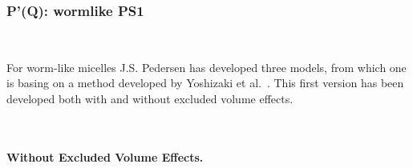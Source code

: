 \clearpage
\subsubsection{P'(Q): wormlike PS1} ~\\
\label{plugin:Pprime4wormPS1}

For worm-like micelles J.S. Pedersen \cite{Pedersen96Macrom} has developed three models, from which one is basing on a method developed by Yoshizaki et al.\ \cite{Yoshizaki1980}. This first version has been developed both with and without excluded volume effects.

~\\
\paragraph*{Without Excluded Volume Effects.}~\\

